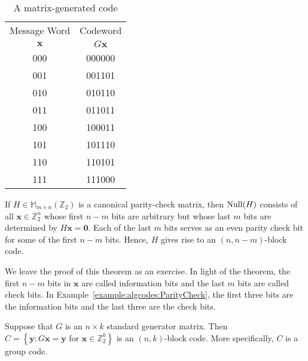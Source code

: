  
\begin{table}[htb]
{\small
\begin{center}
\begin{tabular}{|c|c|}
\hline
Message Word  & Codeword \\
${\mathbf x}$ & $G {\mathbf x}$ \\ \hline
000 & 000000 \\
001 & 001101 \\
010 & 010110 \\
011 & 011011 \\
100 & 100011 \\
101 & 101110 \\
110 & 110101 \\
111 & 111000 \\
\hline
\end{tabular}
\end{center}
}
\caption{A matrix-generated code}\label{matrix_gen_code}
\end{table}
 
 
\begin{theorem}
If $H \in {\mathbb M}_{m \times n}({\mathbb Z}_2)$ is a canonical
parity-check matrix, then ${\rm Null}(H)$ consists of all 
${\mathbf x} \in {\mathbb Z}_2^n$ whose first $n-m$ bits are arbitrary but whose last $m$ bits
are determined by $H{\mathbf x} = {\mathbf 0}$. Each of
the last $m$ bits serves as an even parity check bit for some of the
first $n-m$ bits. Hence, $H$ gives rise to an $(n, n-m)$-block code. 
\end{theorem}


 
 
We leave the proof of this theorem as an exercise. In light of the
theorem, the first $n - m$ bits in ${\mathbf x}$ are called {\bfi
information bits\/} and the last $m$ bits are called {\bfi check bits}.
In Example~\ref{example:algcodes:ParityCheck},  the first three bits are the information bits
and the last three are the check bits.
 
 
\begin{theorem}
Suppose that $G$ is an $n \times k$  standard generator matrix.  Then
$C = \left\{{\mathbf y} : G{\mathbf x} ={\mathbf y}\text{ for }{\mathbf x}\in
{\mathbb  Z}_2^k\right\}$ is an  $(n,k)$-block code. More specifically, $C$
is a group code.  
\end{theorem}
 
